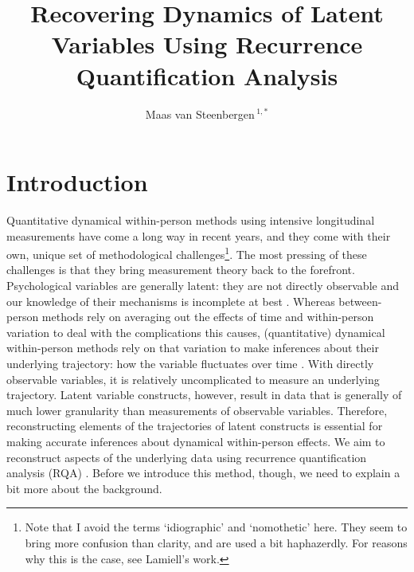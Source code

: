 \documentclass[utf8]{FrontiersinVancouver}
\def\firstAuthorLast{van Steenbergen} %
\def\Authors{Maas van Steenbergen\,$^{1,*}$}
\begin{document}
\onecolumn
{}

\title[Recovering Dynamics Using RQA]{Recovering Dynamics of Latent Variables Using Recurrence Quantification Analysis} 

\author[\firstAuthorLast]{\Authors} %
\address{} %
\correspondance{} %

\extraAuth{}%


\maketitle





\section{Introduction}

Quantitative dynamical within-person methods using intensive longitudinal measurements have come a long way in recent years, and they come with their own, unique set of methodological challenges\footnote{Note that I avoid the terms `idiographic' and `nomothetic' here. They seem to bring more confusion than clarity, and are used a bit haphazerdly. For reasons why this is the case, see Lamiell's work\citep{lamiellNomotheticIdiographicContrasting1998}.}. The most pressing of these challenges is that they bring measurement theory back to the forefront. Psychological variables are generally latent: they are not directly observable and our knowledge of their mechanisms is incomplete at best \citep{bollenLatentVariablesPsychology2002}. Whereas between-person methods rely on averaging out the effects of time and within-person variation to deal with the complications this causes, (quantitative) dynamical within-person methods rely on that variation to make inferences about their underlying trajectory: how the variable fluctuates over time \citep{molenaarManifestoPsychologyIdiographic2004}. With directly observable variables, it is relatively uncomplicated to measure an underlying trajectory. Latent variable constructs, however, result in data that is generally of much lower granularity than measurements of observable variables. Therefore, reconstructing elements of the trajectories of latent constructs is essential for making accurate inferences about dynamical within-person effects. We aim to reconstruct aspects of the underlying data using recurrence quantification analysis (RQA) \citep{webber2005recurrence}. Before we introduce this method, though, we need to explain a bit more about the background.
\end{document}
